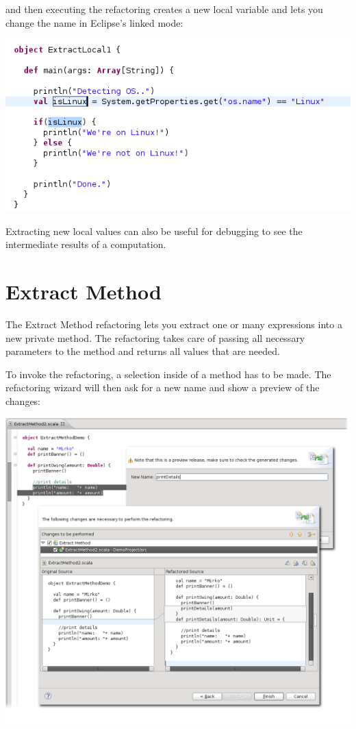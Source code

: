\documentclass[10pt,a4paper,oneside]{scrreprt}
\begin{document}
and then executing the refactoring creates a new local variable and lets you change the name in Eclipse's linked mode:

\begin{center}
  \includegraphics[width=0.8\linewidth]{extract_local_screenshot_3.png}
\end{center}

Extracting new local values can also be useful for debugging to see the intermediate results of a computation.

\section{Extract Method}

The Extract Method refactoring lets you extract one or many expressions into a new private method. The refactoring takes care of passing all necessary parameters to the method and returns all values that are needed.

To invoke the refactoring, a selection inside of a method has to be made. The refactoring wizard will then ask for a new name and show a preview of the changes:

\begin{center}
  \includegraphics[width=\linewidth]{extract_method_screenshot_1.png}
\end{center}
\end{document}
